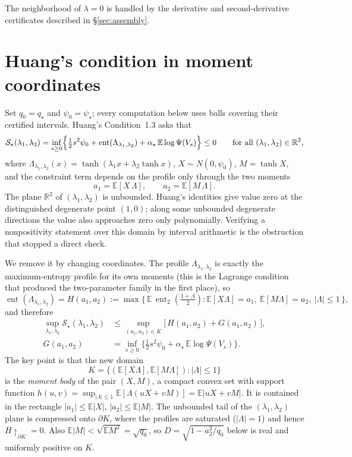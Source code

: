 \documentclass[11pt]{article}
\newcommand{\R}{\mathbb{R}}
\newcommand{\E}{\mathbb{E}}
\DeclareMathOperator{\ent}{ent}
\begin{document}
The neighborhood of $\lambda=0$ is handled by the derivative and
second-derivative certificates described in \S\ref{sec:assembly}.

\section{Huang's condition in moment coordinates}\label{sec:huang-moments}

Set $q_0=q_\star$ and $\psi_0=\psi_\star$; every computation below uses
balls covering their certified intervals.  Huang's Condition~1.3 asks that
\[
  \mathcal{S}_\star(\lambda_1,\lambda_2)
  = \inf_{s\ge 0}\Bigl\{ \tfrac12 s^2\psi_0 + \ent(\Lambda_{\lambda_1,\lambda_2})
    + \alpha_\star\, \E\log\Psi(V_s) \Bigr\} \le 0
  \qquad\text{for all }(\lambda_1,\lambda_2)\in\R^2,
\]
where $\Lambda_{\lambda_1,\lambda_2}(x)=\tanh(\lambda_1 x+\lambda_2\tanh x)$,
$X\sim N(0,\psi_0)$, $M=\tanh X$, and the constraint term depends on the
profile only through the two moments
\[
  a_1 = \E[X\,\Lambda], \qquad a_2 = \E[M\,\Lambda].
\]
The plane $\R^2$ of $(\lambda_1,\lambda_2)$ is unbounded. Huang's identities
give value zero at the distinguished degenerate point $(1,0)$; along some unbounded degenerate
directions the value also approaches zero only polynomially. Verifying a
nonpositivity statement over this domain by interval arithmetic is the
obstruction that stopped a direct check.

We remove it by changing coordinates. The profile
$\Lambda_{\lambda_1,\lambda_2}$ is exactly the maximum-entropy profile for its
own moments (this is the Lagrange condition that produced the two-parameter
family in the first place), so
\[
  \ent(\Lambda_{\lambda_1,\lambda_2}) = H(a_1,a_2)
  := \max\bigl\{\, \E\,\ent_2(\tfrac{1+\Lambda}2) :
     \E[X\Lambda]=a_1,\ \E[M\Lambda]=a_2,\ |\Lambda|\le 1 \,\bigr\},
\]
and therefore
\begin{equation}\label{eq:moment-reduction}
\begin{aligned}
  \sup_{\lambda_1,\lambda_2} \mathcal{S}_\star(\lambda_1,\lambda_2)
  &\le \sup_{(a_1,a_2)\in K}
       \bigl[\, H(a_1,a_2) + G(a_1,a_2) \,\bigr],\\
  G(a_1,a_2)
  &= \inf_{s\ge0}\bigl\{\tfrac12 s^2\psi_0
     + \alpha_\star\, \E\log\Psi(V_s)\bigr\}.
\end{aligned}
\end{equation}
The key point is that the new domain
\[
  K = \bigl\{ (\E[X\Lambda],\E[M\Lambda]) : |\Lambda|\le 1 \bigr\}
\]
is the \emph{moment body} of the pair $(X,M)$, a compact convex set with
support function $h(u,v)=\sup_{|\Lambda|\le1}\E[\Lambda(uX+vM)]=\E|uX+vM|$. It
is contained in the rectangle $|a_1|\le\E|X|$, $|a_2|\le\E|M|$. The unbounded
tail of the $(\lambda_1,\lambda_2)$ plane is compressed onto $\partial K$,
where the profiles are saturated ($|\Lambda|=1$) and hence
$H\!\restriction_{\partial K}=0$.
Also $\E|M|<\sqrt{\E M^2}=\sqrt{q_0}$, so
$D=\sqrt{1-a_2^2/q_0}$ below is real and uniformly positive on $K$.
\end{document}
